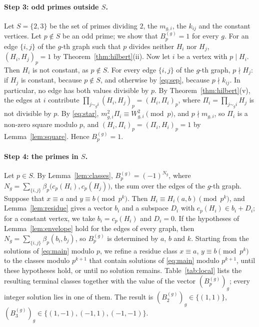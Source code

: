 \documentclass[11pt]{article}
\begin{document}
\paragraph{Step 3: odd primes outside $S$.} Let $S=\{2,3\}$ be the set of primes dividing $2$, the $m_{g,i}$, the $k_{ij}$ and the constant vertices. Let $p\notin S$ be an odd prime; we show that $B^{(g)}_p=1$ for every $g$. For an edge $\{i,j\}$ of the $g$-th graph such that $p$ divides neither $H_i$ nor $H_j$, $(H_i,H_j)_p=1$ by Theorem~\ref{thm:hilbert}(ii). Now let $i$ be a vertex with $p\mid H_i$. Then $H_i$ is not constant, as $p\notin S$. For every edge $\{i,j\}$ of the $g$-th graph, $p\nmid H_j$: if $H_j$ is constant, because $p\notin S$, and otherwise by \eqref{eq:sep}, because $p\nmid k_{ij}$. In particular, no edge has both values divisible by $p$. By Theorem~\ref{thm:hilbert}(v), the edges at $i$ contribute $\prod_{j\sim_g i}(H_i,H_j)_p=(H_i,\Pi_i)_p$, where $\Pi_i=\prod_{j\sim_g i}H_j$ is not divisible by $p$. By \eqref{eq:star}, $m_{g,i}^2\Pi_i\equiv W_{g,i}^2\pmod p$, and $p\nmid m_{g,i}$, so $\Pi_i$ is a non-zero square modulo $p$, and $(H_i,\Pi_i)_p=(\Pi_i,H_i)_p=1$ by Lemma~\ref{lem:square}. Hence $B^{(g)}_p=1$.

\paragraph{Step 4: the primes in $S$.} Let $p\in S$. By Lemma~\ref{lem:classes}, $B^{(g)}_p=(-1)^{N_g}$, where $N_g=\sum_{\{i,j\}}\beta_p\bigl(c_p(H_i),c_p(H_j)\bigr)$, the sum over the edges of the $g$-th graph. Suppose that $x\equiv a$ and $y\equiv b\pmod{p^k}$. Then $H_i\equiv H_i(a,b)\pmod{p^k}$, and Lemma~\ref{lem:residue} gives a vector $b_i$ and a subspace $D_i$ with $c_p(H_i)\in b_i+D_i$; for a constant vertex, we take $b_i=c_p(H_i)$ and $D_i=0$. If the hypotheses of Lemma~\ref{lem:envelope} hold for the edges of every graph, then $N_g=\sum_{\{i,j\}}\beta_p(b_i,b_j)$, so $B^{(g)}_p$ is determined by $a$, $b$ and $k$. Starting from the solutions of \eqref{eq:main} modulo $p$, we refine a residue class $x\equiv a$, $y\equiv b\pmod{p^k}$ to the classes modulo $p^{k+1}$ that contain solutions of \eqref{eq:main} modulo $p^{k+1}$, until these hypotheses hold, or until no solution remains. Table~\ref{tab:local} lists the resulting terminal classes together with the value of the vector $(B^{(g)}_p)_g$; every integer solution lies in one of them. The result is $(B^{(g)}_{2})_g\in\{(1,1)\}$, $(B^{(g)}_{3})_g\in\{(1,-1),\allowbreak (-1,1),\allowbreak (-1,-1)\}$.
\end{document}
